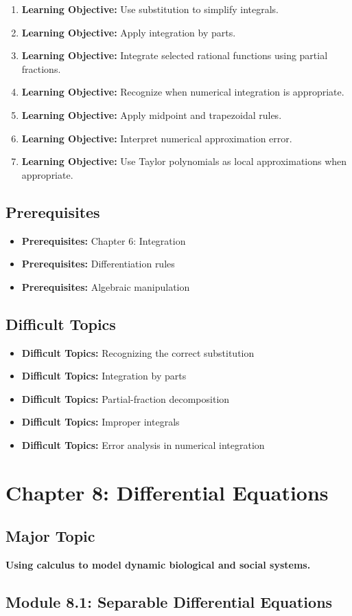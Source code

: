 \documentclass[11pt]{article}
\newcommand{\objective}[1]{\item \textbf{Learning Objective:} #1}
\newcommand{\difficult}[1]{\item \textbf{Difficult Topics:} #1}
\newcommand{\prereq}[1]{\item \textbf{Prerequisites:} #1}
\begin{document}
\begin{enumerate}
    \objective{Use substitution to simplify integrals.}
    \objective{Apply integration by parts.}
    \objective{Integrate selected rational functions using partial fractions.}
    \objective{Recognize when numerical integration is appropriate.}
    \objective{Apply midpoint and trapezoidal rules.}
    \objective{Interpret numerical approximation error.}
    \objective{Use Taylor polynomials as local approximations
    when appropriate.}
\end{enumerate}

\subsection{Prerequisites}

\begin{itemize}
    \prereq{Chapter 6: Integration}
    \prereq{Differentiation rules}
    \prereq{Algebraic manipulation}
\end{itemize}

\subsection{Difficult Topics}

\begin{itemize}
    \difficult{Recognizing the correct substitution}
    \difficult{Integration by parts}
    \difficult{Partial-fraction decomposition}
    \difficult{Improper integrals}
    \difficult{Error analysis in numerical integration}
\end{itemize}


\section{Chapter 8: Differential Equations}

\subsection{Major Topic}

\textbf{Using calculus to model dynamic biological and social systems.}

\subsection{Module 8.1: Separable Differential Equations}
\end{document}
